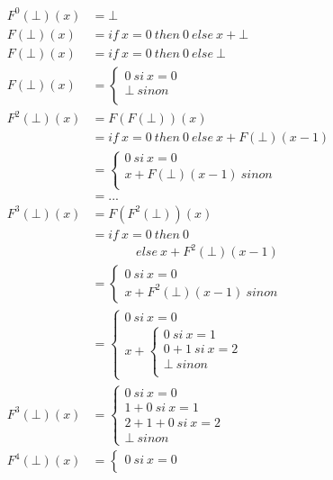 \documentclass[11pt,a4paper]{article}
\begin{document}
	\begin{align*}
		F^{0}(\bot)(x) &= \bot\\
		F(\bot)(x) &= if\ x = 0\ then\ 0\ else\ x + \bot\\
		F(\bot)(x) &= if\ x = 0\ then\ 0\ else\ \bot\\
		F(\bot)(x) &= 	\begin{cases}
							0\ si\ x = 0\\
							\bot\ sinon\\
						\end{cases}\\
		F^{2}(\bot)(x) &= F(F(\bot))(x)\\
		&= if\ x = 0\ then\ 0\ else\ x + F(\bot)(x - 1)\\
		&= 	\begin{cases}
				0\ si\ x = 0\\
				x + F(\bot)(x - 1)\ sinon\\
			\end{cases}\\
		&= ...\\
		F^3(\bot)(x) &= F(F^2(\bot))(x)\\
		&= if\ x = 0\ then\ 0\\
		&\ \ \ \ \ \ \ \ \ \ \ \ \ \ \ \ else\ x + F^2(\bot)(x - 1)\\
		&=	\begin{cases}
				0\ si\ x = 0\\
				x + F^2(\bot)(x - 1)\ sinon
			\end{cases}\\
		&=	\begin{cases}
				0\ si\ x = 0\\
				x + \begin{cases}
						0\ si\ x = 1\\
						0 + 1\ si\ x = 2\\
						\bot \ sinon\\
					\end{cases}
			\end{cases}\\
		F^3(\bot)(x) &=	\begin{cases}
							0\ si\ x = 0\\
							1 + 0\ si\ x = 1\\
							2 + 1 + 0\ si\ x = 2\\
							\bot\ sinon
						\end{cases}\\	
		F^4(\bot)(x) &=	\begin{cases}
							0\ si\ x = 0\\

\end{cases}
\end{align*}
\end{document}
